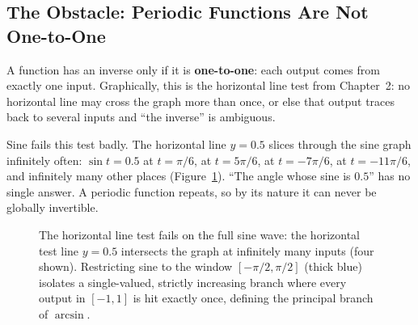 \subsection{The Obstacle: Periodic Functions Are Not One-to-One}

A function has an inverse only if it is \textbf{one-to-one}: each output comes from exactly one input. Graphically, this is the horizontal line test from Chapter~2: no horizontal line may cross the graph more than once, or else that output traces back to several inputs and ``the inverse'' is ambiguous.

Sine fails this test badly. The horizontal line $y = 0.5$ slices through the sine graph infinitely often: $\sin t = 0.5$ at $t = \pi/6$, at $t = 5\pi/6$, at $t = -7\pi/6$, at $t = -11\pi/6$, and infinitely many other places (Figure~\ref{ch04:fig-horizontal-line-test}). ``The angle whose sine is $0.5$'' has no single answer. A periodic function repeats, so by its nature it can never be globally invertible.

\begin{figure}[htbp]
\centering
{}
\caption{The horizontal line test fails on the full sine wave: the horizontal test line $y = 0.5$ intersects the graph at infinitely many inputs (four shown). Restricting sine to the window $[-\pi/2, \pi/2]$ (thick blue) isolates a single-valued, strictly increasing branch where every output in $[-1,1]$ is hit exactly once, defining the principal branch of $\arcsin$.}
\label{ch04:fig-horizontal-line-test}
\end{figure}

